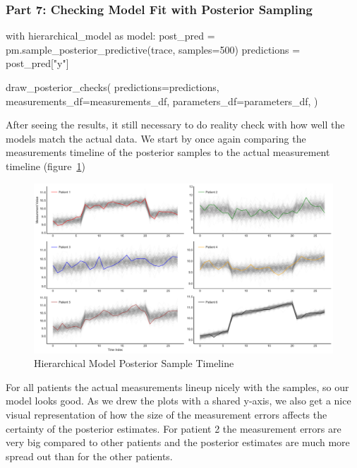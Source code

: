 \documentclass[12pt,a4paper,leqno]{report}
\theoremstyle{plain}
\theoremstyle{definition}
\theoremstyle{remark}
\begin{document}
\subsubsection*{Part 7: Checking Model Fit with Posterior Sampling}

\bigskip
\begin{pyverbatim}[][fontsize=\footnotesize]
with hierarchical_model as model:
    post_pred = pm.sample_posterior_predictive(trace, samples=500)
    predictions = post_pred["y"]

draw_posterior_checks(
    predictions=predictions,
    measurements_df=measurements_df,
    parameters_df=parameters_df,
)
\end{pyverbatim}
\smallskip

After seeing the results, it still necessary to do reality check with how well the
models match the actual data. We start by once again comparing the measurements timeline
of the posterior samples to the actual measurement timeline (figure\ \ref{hierarhicalmodelposteriortimeline})

\bigskip
\begin{figure}[H]
    \caption{Hierarchical Model Posterior Sample Timeline}\label{hierarhicalmodelposteriortimeline}
    \bigskip
    \includegraphics[width=\textwidth,height=\textheight,keepaspectratio]{posterior_sample_timeline_hierarchical_model.pdf}
\end{figure}
\bigskip

For all patients the actual measurements lineup nicely with the samples, so our model
looks good. As we drew the plots with a shared y-axis, we also get a nice visual
representation of how the size of the measurement errors
affects the certainty of the posterior estimates. For patient 2 the measurement errors are
very big compared to other patients and the posterior estimates
are much more spread out than for the other patients.
\end{document}
